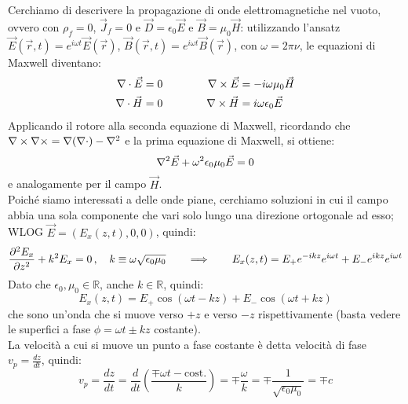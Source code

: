 Cerchiamo di descrivere la propagazione di onde elettromagnetiche nel vuoto, ovvero con $ \rho_f = 0 $, $ \vec{J}_f = 0 $ e $ \vec{D} = \epsilon_0 \vec{E} $ e $ \vec{B} = \mu_0 \vec{H} $: utilizzando l'ansatz $ \vec{E}(\vec{r}, t) = e^{i\omega t}\vec{E}(\vec{r}) $, $ \vec{B}(\vec{r}, t) = e^{i\omega t}\vec{B}(\vec{r}) $, con $ \omega = 2\pi \nu $, le equazioni di Maxwell diventano:
\begin{equation}
	\begin{split}
		\nabla\cdot\vec{E} &= 0 \\ 
		\nabla\cdot\vec{H} &= 0 
	\end{split}
	\qquad\qquad
	\begin{split}
		\nabla\times\vec{E} &= - i\omega \mu_0 \vec{H} \\ 
		\nabla\times\vec{H} &= i\omega \epsilon_0 \vec{E}
	\end{split}
	\label{eq:9}
\end{equation}
Applicando il rotore alla seconda equazione di Maxwell, ricordando che $ \nabla\times\nabla\times = \nabla(\nabla\cdot) - \nabla^2 $ e la prima equazione di Maxwell, si ottiene:
\begin{equation}
	\nabla^2\vec{E} + \omega^2 \epsilon_0 \mu_0 \vec{E} = 0
	\label{eq:10}
\end{equation}
e analogamente per il campo $ \vec{H} $. \\ 
%
Poiché siamo interessati a delle onde piane, cerchiamo soluzioni in cui il campo abbia una sola componente che vari solo lungo una direzione ortogonale ad esso; WLOG $ \vec{E} = (E_x (z,t), 0, 0) $, quindi:
\begin{equation}
	\frac{\partial^2 E_x}{\partial z^2} + k^2 E_x = 0 \,,\quad k \equiv \omega\sqrt{\epsilon_0\mu_0} \qquad\Longrightarrow\qquad E_x(z,t) = E_+ e^{-ikz}e^{i\omega t} + E_- e^{ikz} e^{i\omega t}
	\label{eq:11}
\end{equation}
Dato che $ \epsilon_0, \mu_0 \in \mathbb{R} $, anche $ k\in\mathbb{R} $, quindi:
\begin{equation}
	E_x(z,t) = E_+ \cos(\omega t - kz) + E_- \cos(\omega t + kz)
	\label{eq:12}
\end{equation}
che sono un'onda che si muove verso $ +z $ e verso $ -z $ rispettivamente (basta vedere le superfici a fase $ \phi = \omega t \pm kz $ costante). \\ 
La velocità a cui si muove un punto a fase costante è detta velocità di fase $ v_p = \frac{dz}{dt} $, quindi:
\begin{equation}
	v_p = \frac{dz}{dt} = \frac{d}{dt} \left(\frac{\mp \omega t - \text{cost.}}{k}\right) = \mp \frac{\omega}{k} = \mp \frac{1}{\sqrt{\epsilon_0\mu_0}} = \mp c
	\label{eq:13}
\end{equation}
